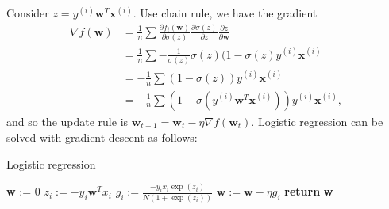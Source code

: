 \documentclass[../main.tex]{subfiles}
\begin{document}
Consider $z=y^{(i)}\textbf{w}^T\textbf{x}^{(i)}$. Use chain rule, we have the gradient
\begin{equation} \label{eq1-5}
\begin{split}
\nabla f(\textbf{w}) & = \frac{1}{n}\sum\frac{\partial f_i(\textbf{w})}{\partial \sigma(z)}\frac{\partial \sigma(z)}{\partial z}\frac{\partial z}{\partial \textbf{w}} \\
 & = \frac{1}{n}\sum-\frac{1}{\sigma(z)}\sigma(z)(1-\sigma(z)y^{(i)}\textbf{x}^{(i)} \\
 & = -\frac{1}{n}\sum(1-\sigma(z))y^{(i)}\textbf{x}^{(i)} \\
 & = -\frac{1}{n}\sum(1-\sigma(y^{(i)}\textbf{w}^T\textbf{x}^{(i)}))y^{(i)}\textbf{x}^{(i)},
\end{split}
\end{equation}
and so the update rule is $\textbf{w}_{t+1}=\textbf{w}_t-\eta\nabla f(\textbf{w}_t)$. Logistic regression can be solved with gradient descent as follows:

\smallskip\begin{algorithm}[H]
\caption{Logistic regression}\label{logistic}
\begin{algorithmic}[5]
  \State \textbf{w} := 0
    \State $z_i:=-y_i\textbf{w}^Tx_i$
      \State $g_i:=\frac{-y_ix_i\exp{(z_i)}}{N(1+\exp{(z_i)})}$
      \State $\textbf{w}:=\textbf{w}-\eta g_i$
    \EndFor
  \EndFor
  \State \textbf{return} \textbf{w}
\EndProcedure
\end{algorithmic}
\end{algorithm}\smallskip
\end{document}
